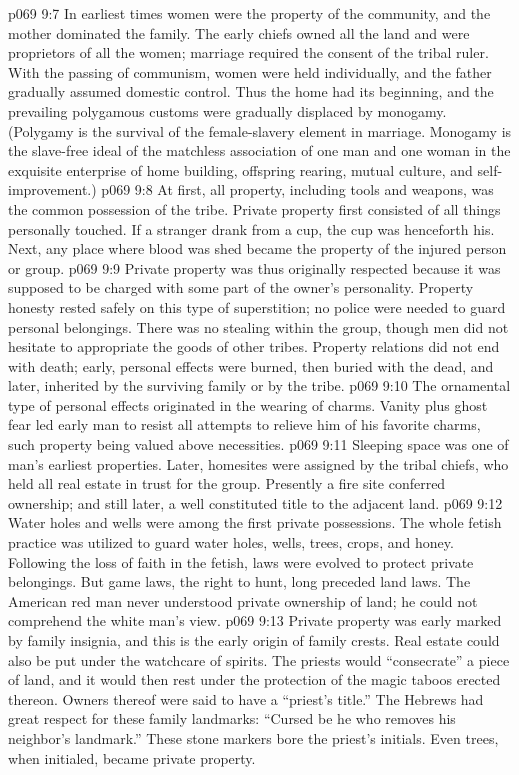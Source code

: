 \vs p069 9:7 In earliest times women were the property of the community, and the mother dominated the family. The early chiefs owned all the land and were proprietors of all the women; marriage required the consent of the tribal ruler. With the passing of communism, women were held individually, and the father gradually assumed domestic control. Thus the home had its beginning, and the prevailing polygamous customs were gradually displaced by monogamy. (Polygamy is the survival of the female\hyp{}slavery element in marriage. Monogamy is the slave\hyp{}free ideal of the matchless association of one man and one woman in the exquisite enterprise of home building, offspring rearing, mutual culture, and self\hyp{}improvement.)
\vs p069 9:8 At first, all property, including tools and weapons, was the common possession of the tribe. Private property first consisted of all things personally touched. If a stranger drank from a cup, the cup was henceforth his. Next, any place where blood was shed became the property of the injured person or group.
\vs p069 9:9 Private property was thus originally respected because it was supposed to be charged with some part of the owner’s personality. Property honesty rested safely on this type of superstition; no police were needed to guard personal belongings. There was no stealing within the group, though men did not hesitate to appropriate the goods of other tribes. Property relations did not end with death; early, personal effects were burned, then buried with the dead, and later, inherited by the surviving family or by the tribe.
\vs p069 9:10 The ornamental type of personal effects originated in the wearing of charms. Vanity plus ghost fear led early man to resist all attempts to relieve him of his favorite charms, such property being valued above necessities.
\pc \vs p069 9:11 Sleeping space was one of man’s earliest properties. Later, homesites were assigned by the tribal chiefs, who held all real estate in trust for the group. Presently a fire site conferred ownership; and still later, a well constituted title to the adjacent land.
\vs p069 9:12 Water holes and wells were among the first private possessions. The whole fetish practice was utilized to guard water holes, wells, trees, crops, and honey. Following the loss of faith in the fetish, laws were evolved to protect private belongings. But game laws, the right to hunt, long preceded land laws. The American red man never understood private ownership of land; he could not comprehend the white man’s view.
\vs p069 9:13 Private property was early marked by family insignia, and this is the early origin of family crests. Real estate could also be put under the watchcare of spirits. The priests would “consecrate” a piece of land, and it would then rest under the protection of the magic taboos erected thereon. Owners thereof were said to have a “priest’s title.” The Hebrews had great respect for these family landmarks: “Cursed be he who removes his neighbor’s landmark.” These stone markers bore the priest’s initials. Even trees, when initialed, became private property.
